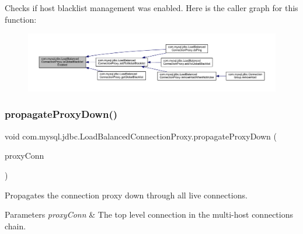Checks if host blacklist management was enabled. Here is the caller graph for this function\+:
\nopagebreak
\begin{figure}[H]
\begin{center}
\leavevmode
\includegraphics[width=350pt]{classcom_1_1mysql_1_1jdbc_1_1_load_balanced_connection_proxy_ad91c83a171c79295fa29cfdca16cc89f_icgraph}
\end{center}
\end{figure}
\mbox{\label{classcom_1_1mysql_1_1jdbc_1_1_load_balanced_connection_proxy_a2ffcb6b0b83a7bb3fa53727073e59970}} 
\subsubsection{\texorpdfstring{propagate\+Proxy\+Down()}{propagateProxyDown()}}
{\footnotesize\ttfamily void com.\+mysql.\+jdbc.\+Load\+Balanced\+Connection\+Proxy.\+propagate\+Proxy\+Down (\begin{DoxyParamCaption}\item[{\mbox{\hyperlink{interfacecom_1_1mysql_1_1jdbc_1_1_my_s_q_l_connection}{My\+S\+Q\+L\+Connection}}}]{proxy\+Conn }\end{DoxyParamCaption})\hspace{0.3cm}{\ttfamily [protected]}}

Propagates the connection proxy down through all live connections.


\begin{DoxyParams}{Parameters}
{\em proxy\+Conn} & The top level connection in the multi-\/host connections chain. \\
\hline
\end{DoxyParams}
\mbox{\label{classcom_1_1mysql_1_1jdbc_1_1_load_balanced_connection_proxy_a671d1d7d042aa5164bf1078996303433}} 
